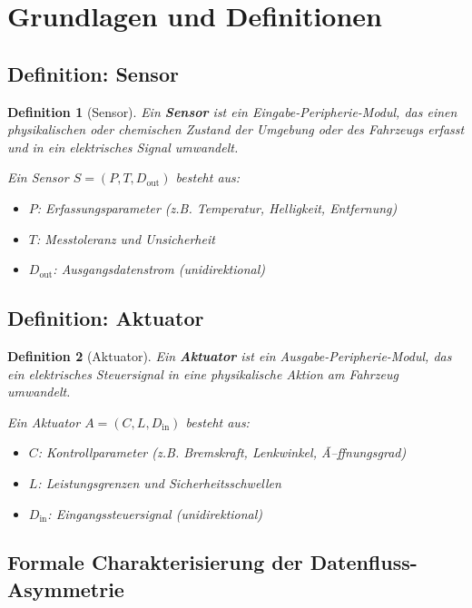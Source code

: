 ﻿\documentclass[a4paper,12pt]{article}
\newtheorem{definition}{Definition}
\begin{document}
\section{Grundlagen und Definitionen}

\subsection{Definition: Sensor}

\begin{definition}[Sensor]
Ein \textbf{Sensor} ist ein Eingabe-Peripherie-Modul, das einen physikalischen oder 
chemischen Zustand der Umgebung oder des Fahrzeugs erfasst und in ein elektrisches Signal 
umwandelt.

Ein Sensor $S = (P, T, D_{\text{out}})$ besteht aus:
\begin{itemize}
	\item $P$: Erfassungsparameter (z.B. Temperatur, Helligkeit, Entfernung)
	\item $T$: Messtoleranz und Unsicherheit
	\item $D_{\text{out}}$: Ausgangsdatenstrom (unidirektional)
\end{itemize}
\end{definition}

\subsection{Definition: Aktuator}

\begin{definition}[Aktuator]
Ein \textbf{Aktuator} ist ein Ausgabe-Peripherie-Modul, das ein elektrisches Steuersignal 
in eine physikalische Aktion am Fahrzeug umwandelt.

Ein Aktuator $A = (C, L, D_{\text{in}})$ besteht aus:
\begin{itemize}
	\item $C$: Kontrollparameter (z.B. Bremskraft, Lenkwinkel, Ã–ffnungsgrad)
	\item $L$: Leistungsgrenzen und Sicherheitsschwellen
	\item $D_{\text{in}}$: Eingangssteuersignal (unidirektional)
\end{itemize}
\end{definition}

\subsection{Formale Charakterisierung der Datenfluss-Asymmetrie}
\end{document}
